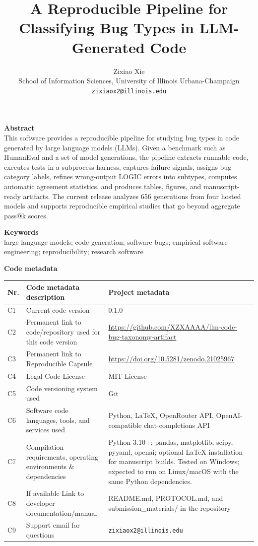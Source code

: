 \documentclass[11pt, letterpaper]{article}
\title{\textbf{A Reproducible Pipeline for Classifying Bug Types in LLM-Generated Code}}
\author{Zixiao Xie\\
School of Information Sciences, University of Illinois Urbana-Champaign\\
\texttt{zixiaox2@illinois.edu}}
\date{}
\begin{document}
\maketitle

\noindent
\textbf{Abstract}\\
This software provides a reproducible pipeline for studying bug types
in code generated by large language models (LLMs). Given a benchmark such as
HumanEval and a set of model generations, the pipeline extracts runnable code,
executes tests in a subprocess harness, captures failure signals, assigns
bug-category labels, refines wrong-output LOGIC errors into subtypes, computes automatic
agreement statistics, and produces tables, figures, and manuscript-ready
artifacts. The current release analyzes 656 generations from four hosted
models and supports reproducible empirical studies that go beyond aggregate pass@k
scores.

\vskip0.4cm
\noindent
\textbf{Keywords}\\
large language models; code generation; software bugs; empirical software
engineering; reproducibility; research software

\newpage
\noindent
\textbf{Code metadata}\\

\vskip0.2cm
\noindent
\begin{tabular}{|p{0.8cm}|p{6.2cm}|p{9.8cm}|}
\hline
\textbf{Nr.} & \textbf{Code metadata description} & \textbf{Project metadata} \\
\hline
C1 & Current code version & 0.1.0 \\
\hline
C2 & Permanent link to code/repository used for this code version & \url{https://github.com/XZXAAAA/llm-code-bug-taxonomy-artifact} \\
\hline
C3 & Permanent link to Reproducible Capsule & \url{https://doi.org/10.5281/zenodo.21025967} \\
\hline
C4 & Legal Code License & MIT License \\
\hline
C5 & Code versioning system used & Git \\
\hline
C6 & Software code languages, tools, and services used & Python, LaTeX, OpenRouter API, OpenAI-compatible chat-completions API \\
\hline
C7 & Compilation requirements, operating environments \& dependencies & Python 3.10+; pandas, matplotlib, scipy, pyyaml, openai; optional LaTeX installation for manuscript builds. Tested on Windows; expected to run on Linux/macOS with the same Python dependencies. \\
\hline
C8 & If available Link to developer documentation/manual & README.md, PROTOCOL.md, and submission\_materials/ in the repository \\
\hline
C9 & Support email for questions & \texttt{zixiaox2@illinois.edu} \\
\hline
\end{tabular}
\end{document}
